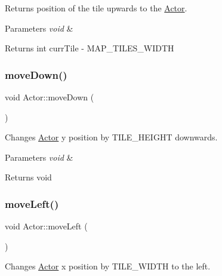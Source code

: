 Returns position of the tile upwards to the \mbox{\hyperlink{class_actor}{Actor}}. 


\begin{DoxyParams}{Parameters}
{\em void} & \\
\hline
\end{DoxyParams}
\begin{DoxyReturn}{Returns}
int curr\+Tile -\/ M\+A\+P\+\_\+\+T\+I\+L\+E\+S\+\_\+\+W\+I\+D\+TH 
\end{DoxyReturn}
\mbox{\label{class_actor_abc0ed5cc187310fef30b4b9a94252e17}} 
\subsubsection{\texorpdfstring{move\+Down()}{moveDown()}}
{\footnotesize\ttfamily void Actor\+::move\+Down (\begin{DoxyParamCaption}\item[{void}]{ }\end{DoxyParamCaption})}



Changes \mbox{\hyperlink{class_actor}{Actor}} y position by T\+I\+L\+E\+\_\+\+H\+E\+I\+G\+HT downwards. 


\begin{DoxyParams}{Parameters}
{\em void} & \\
\hline
\end{DoxyParams}
\begin{DoxyReturn}{Returns}
void 
\end{DoxyReturn}
\mbox{\label{class_actor_a66e25276468e157b822c9df798eb3e6a}} 
\subsubsection{\texorpdfstring{move\+Left()}{moveLeft()}}
{\footnotesize\ttfamily void Actor\+::move\+Left (\begin{DoxyParamCaption}\item[{void}]{ }\end{DoxyParamCaption})}



Changes \mbox{\hyperlink{class_actor}{Actor}} x position by T\+I\+L\+E\+\_\+\+W\+I\+D\+TH to the left. 


